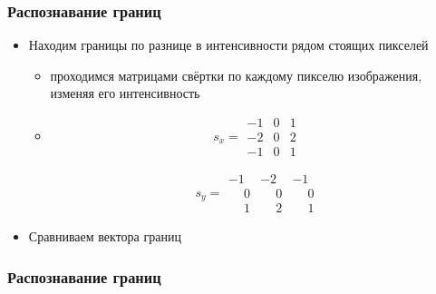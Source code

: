 \documentclass[xetex,mathserif,serif]{beamer}
\begin{document}
\begin{frame}
	\frametitle{Распознавание границ}

	\begin{itemize}
		\item Находим границы по разнице в интенсивности рядом стоящих пикселей
		      \begin{itemize}
			      \item проходимся матрицами свёртки по каждому пикселю изображения, изменяя его интенсивность
			      \item
			            $$s_{x}=\begin{matrix}
					            -1 & 0 & 1 \\
					            -2 & 0 & 2 \\
					            -1 & 0 & 1
				            \end{matrix}$$

			            $$s_{y}=\begin{matrix}

					            -1           & -2           & -1           \\
					            \phantom{-}0 & \phantom{-}0 & \phantom{-}0 \\
					            \phantom{-}1 & \phantom{-}2 & \phantom{-}1
				            \end{matrix}$$
		      \end{itemize}
		\item Сравниваем вектора границ
	\end{itemize}
\end{frame}


\begin{frame}
	\frametitle{Распознавание границ}

	\begin{figure}[]
		\centering
		\hfill
	\end{figure}
\end{frame}
\end{document}
